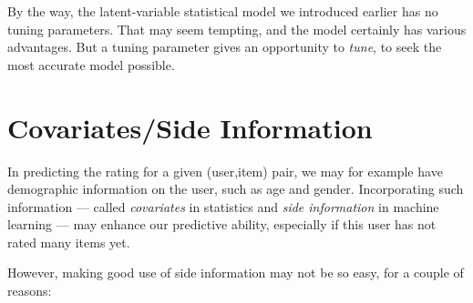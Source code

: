 By the way, the latent-variable statistical model we introduced earlier
has no tuning parameters.  That may seem tempting, and the model
certainly has various advantages.  But a tuning parameter gives an
opportunity to \textit{tune}, to seek the most accurate model possible.

\section{Covariates/Side Information}

In predicting the rating for a given (user,item) pair, we may for
example have demographic information on the user, such as age and
gender.  Incorporating such information --- called \textit{covariates}
in statistics and \textit{side information} in machine learning --- may
enhance our predictive ability, especially if this user has not rated
many items yet.

However, making good use of side information may not be so easy, for a
couple of reasons:

